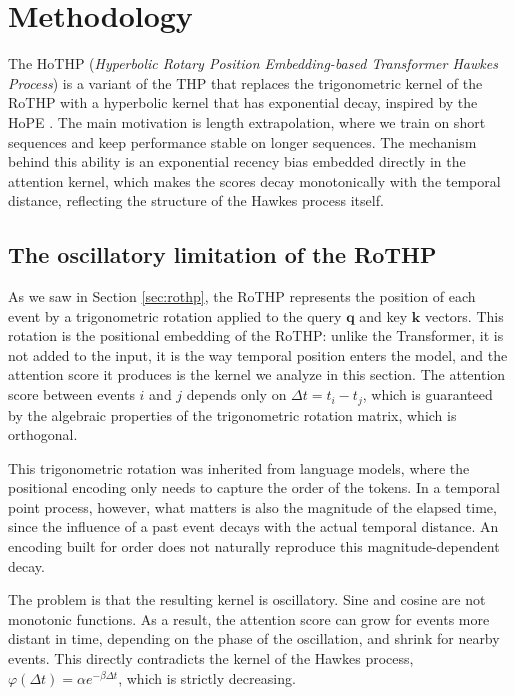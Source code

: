 \chapter{Methodology}
\label{chap:metodologia}

The HoTHP (\textit{Hyperbolic Rotary Position Embedding-based Transformer Hawkes Process}) is a variant of the THP that replaces the trigonometric kernel of the RoTHP with a hyperbolic kernel that has exponential decay, inspired by the HoPE \cite{dai_hope_2025}. The main motivation is length extrapolation, where we train on short sequences and keep performance stable on longer sequences. The mechanism behind this ability is an exponential recency bias embedded directly in the attention kernel, which makes the scores decay monotonically with the temporal distance, reflecting the structure of the Hawkes process itself.

\section{The oscillatory limitation of the RoTHP}
\label{sec:limitacao-rothp}

As we saw in Section \ref{sec:rothp}, the RoTHP represents the position of each event by a trigonometric rotation applied to the query $\mathbf{q}$ and key $\mathbf{k}$ vectors. This rotation is the positional embedding of the RoTHP: unlike the Transformer, it is not added to the input, it is the way temporal position enters the model, and the attention score it produces is the kernel we analyze in this section. The attention score between events $i$ and $j$ depends only on $\Delta t = t_i - t_j$, which is guaranteed by the algebraic properties of the trigonometric rotation matrix, which is orthogonal.

This trigonometric rotation was inherited from language models, where the positional encoding only needs to capture the order of the tokens. In a temporal point process, however, what matters is also the magnitude of the elapsed time, since the influence of a past event decays with the actual temporal distance. An encoding built for order does not naturally reproduce this magnitude-dependent decay.

The problem is that the resulting kernel is oscillatory. Sine and cosine are not monotonic functions. As a result, the attention score can grow for events more distant in time, depending on the phase of the oscillation, and shrink for nearby events. This directly contradicts the kernel of the Hawkes process, $\varphi(\Delta t) = \alpha e^{-\beta \Delta t}$, which is strictly decreasing.

